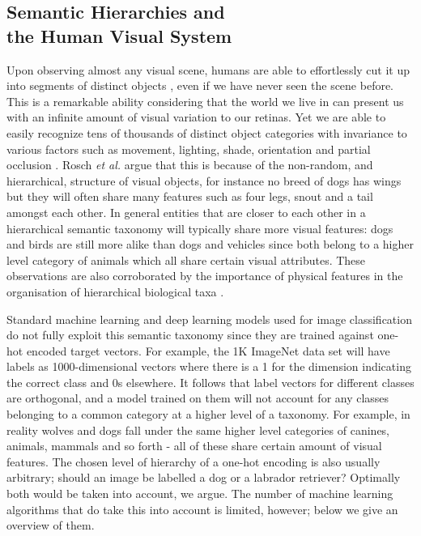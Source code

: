 \documentclass[12pt]{report}
\begin{document}
\subsection{Semantic Hierarchies and \\ the Human Visual System}
Upon observing almost any visual scene, humans are able to effortlessly cut it up into segments of distinct objects \cite{Rosch1976}, even if we have never seen the scene before. This is a remarkable ability considering that the world we live in can present us with an infinite amount of visual variation to our retinas. Yet we are able to easily recognize tens of thousands of distinct object categories \cite{Biederman1989} with invariance to various factors such as movement, lighting, shade, orientation and partial occlusion \cite{DiCarlo2012}. Rosch \textit{et al.} \cite{Rosch1976} argue that this is because of the non-random, and hierarchical, structure of visual objects, for instance no breed of dogs has wings but they will often share many features such as four legs, snout and a tail amongst each other. In general entities that are closer to each other in a hierarchical semantic taxonomy will typically share more visual features: dogs and birds are still more alike than dogs and vehicles since both belong to a higher level category of animals which all share certain visual attributes. These observations are also corroborated by the importance of physical features in the organisation of hierarchical biological taxa \cite{Ohl2015}.

Standard machine learning and deep learning models used for image classification do not fully exploit this semantic taxonomy since they are trained against one-hot encoded target vectors. For example, the 1K ImageNet data set \cite{JiaDeng2009} will have labels as 1000-dimensional vectors where there is a 1 for the dimension indicating the correct class and 0s elsewhere. It follows that label vectors for different classes are orthogonal, and a model trained on them will not account for any classes belonging to a common category at a higher level of a taxonomy. For example, in reality wolves and dogs fall under the same higher level categories of canines, animals, mammals and so forth - all of these share certain amount of visual features. The chosen level of hierarchy of a one-hot encoding is also usually arbitrary; should an image be labelled a dog or a labrador retriever? Optimally both would be taken into account, we argue. The number of machine learning algorithms that do take this into account is limited, however; below we give an overview of them.
\end{document}
